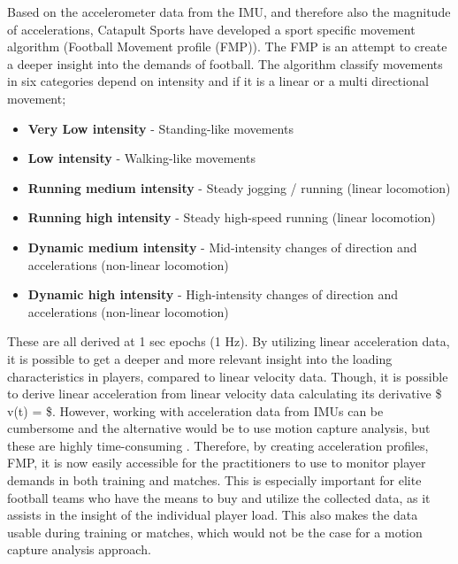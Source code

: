 \documentclass[
]{article}
\providecommand{\tightlist}{%
  \setlength{\itemsep}{0pt}\setlength{\parskip}{0pt}}
\begin{document}
Based on the accelerometer data from the IMU, and therefore also the
magnitude of accelerations, Catapult Sports have developed a sport
specific movement algorithm (Football Movement profile (FMP)). The FMP
is an attempt to create a deeper insight into the demands of football.
The algorithm classify movements in six categories depend on intensity
and if it is a linear or a multi directional movement;

\begin{itemize}
\tightlist
\item
  \textbf{Very Low intensity} - Standing-like movements
\item
  \textbf{Low intensity} - Walking-like movements
\item
  \textbf{Running medium intensity} - Steady jogging / running (linear
  locomotion)
\item
  \textbf{Running high intensity} - Steady high-speed running (linear
  locomotion)
\item
  \textbf{Dynamic medium intensity} - Mid-intensity changes of direction
  and accelerations (non-linear locomotion)
\item
  \textbf{Dynamic high intensity} - High-intensity changes of direction
  and accelerations (non-linear locomotion)
\end{itemize}

These are all derived at 1 sec epochs (1 Hz). By utilizing linear
acceleration data, it is possible to get a deeper and more relevant
insight into the loading characteristics in players, compared to linear
velocity data. Though, it is possible to derive linear acceleration from
linear velocity data calculating its derivative \$ v(t) = 
\$. However, working with acceleration data from IMUs can be cumbersome
and the alternative would be to use motion capture analysis, but these
are highly time-consuming \citep{Petersen2009}. Therefore, by creating
acceleration profiles, FMP, it is now easily accessible for the
practitioners to use to monitor player demands in both training and
matches. This is especially important for elite football teams who have
the means to buy and utilize the collected data, as it assists in the
insight of the individual player load. This also makes the data usable
during training or matches, which would not be the case for a motion
capture analysis approach.
\end{document}
